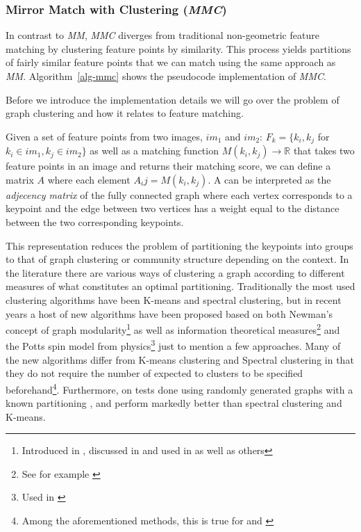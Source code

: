 \subsubsection{Mirror Match with Clustering (\emph{MMC})}
%
In contrast to \emph{MM}, \emph{MMC} diverges from traditional 
non-geometric feature matching by clustering feature points by 
similarity. This process yields partitions of fairly similar feature 
points that we can match using the same approach as \emph{MM}.  
Algorithm~\ref{alg-mmc} shows the pseudocode implementation of \emph{MMC}.

Before we introduce the implementation details we will go over the 
problem of graph clustering and how it relates to feature matching.

Given a set of feature points from two images, $im_1$ and $im_2$: $F_k = 
\{k_i, k_j$ for $k_i \in im_1, k_j \in im_2\}$ as well as a matching 
function $M(k_i, k_j) \rightarrow \mathbb{R}$ that takes two feature 
points in an image and returns their matching score, we can define a 
matrix $A$ where each element $A_ij = M(k_i, k_j)$. A can be interpreted 
as the \emph{adjecency matrix} of the fully connected graph where each 
vertex corresponds to a keypoint and the edge between two vertices has a 
weight equal to the distance between the two corresponding keypoints.

This representation reduces the problem of partitioning the keypoints 
into groups to that of graph clustering or community structure depending 
on the context. In the literature there are various ways of clustering a 
graph according to different measures of what constitutes an optimal 
partitioning. Traditionally the most used clustering algorithms have 
been K-means and spectral clustering, but in recent years a host of new 
algorithms have been proposed based on both Newman's concept of graph 
modularity\footnote{Introduced in \cite{girvan2002}, discussed in 
\cite{brandes2007} and used in \cite{blondel2008} as well as others} as 
well as information theoretical measures\footnote{See for example 
\cite{rosvall2008}} and the Potts spin model from physics\footnote{Used 
in \cite{ronhovde2009}} just to mention a few approaches. Many of the 
new algorithms differ from K-means clustering and Spectral clustering 
in that they do not require the number of expected to clusters to be 
specified beforehand\footnote{Among the aforementioned methods, this is 
true for \cite{blondel2008} and \cite{rosvall2008}}.  Furthermore, on 
tests done using randomly generated graphs with a known partitioning 
\cite{blondel2008}, \cite{rosvall2008} and \cite{ronhovde2009} perform 
markedly better than spectral clustering and 
K-means\cite{lancichinetti2009}.

